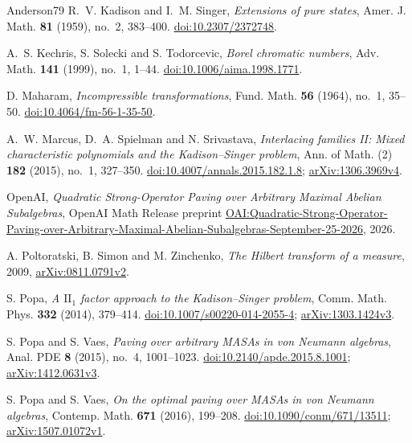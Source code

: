 \begin{thebibliography}{Anderson79}
R.~V. Kadison and I.~M. Singer,
\emph{Extensions of pure states},
Amer. J. Math. \textbf{81} (1959), no.~2, 383--400.
\href{https://doi.org/10.2307/2372748}{doi:10.2307/2372748}.

A.~S. Kechris, S. Solecki and S. Todorcevic,
\emph{Borel chromatic numbers},
Adv. Math. \textbf{141} (1999), no.~1, 1--44.
\href{https://doi.org/10.1006/aima.1998.1771}{doi:10.1006/aima.1998.1771}.

D. Maharam,
\emph{Incompressible transformations},
Fund. Math. \textbf{56} (1964), no.~1, 35--50.
\href{https://doi.org/10.4064/fm-56-1-35-50}{doi:10.4064/fm-56-1-35-50}.

A.~W. Marcus, D.~A. Spielman and N. Srivastava,
\emph{Interlacing families II: Mixed characteristic polynomials and the
Kadison--Singer problem},
Ann. of Math. (2) \textbf{182} (2015), no.~1, 327--350.
\href{https://doi.org/10.4007/annals.2015.182.1.8}{doi:10.4007/annals.2015.182.1.8};
\href{https://arxiv.org/abs/1306.3969v4}{arXiv:1306.3969v4}.

OpenAI,
\emph{Quadratic Strong-Operator Paving over Arbitrary Maximal Abelian Subalgebras},
OpenAI Math Release preprint
\href{https://github.com/openai/math/blob/main/preprints/Quadratic-Strong-Operator-Paving-over-Arbitrary-Maximal-Abelian-Subalgebras-September-25-2026/Quadratic-Strong-Operator-Paving-over-Arbitrary-Maximal-Abelian-Subalgebras-September-25-2026.pdf}{OAI:Quadratic-Strong-Operator-Paving-over-Arbitrary-Maximal-Abelian-Subalgebras-September-25-2026},
2026.

A. Poltoratski, B. Simon and M. Zinchenko,
\emph{The Hilbert transform of a measure},
2009, \href{https://arxiv.org/abs/0811.0791v2}{arXiv:0811.0791v2}.

S. Popa,
\emph{A \(\mathrm{II}_1\) factor approach to the Kadison--Singer problem},
Comm. Math. Phys. \textbf{332} (2014), 379--414.
\href{https://doi.org/10.1007/s00220-014-2055-4}{doi:10.1007/s00220-014-2055-4};
\href{https://arxiv.org/abs/1303.1424v3}{arXiv:1303.1424v3}.

S. Popa and S. Vaes,
\emph{Paving over arbitrary MASAs in von Neumann algebras},
Anal. PDE \textbf{8} (2015), no.~4, 1001--1023.
\href{https://doi.org/10.2140/apde.2015.8.1001}{doi:10.2140/apde.2015.8.1001};
\href{https://arxiv.org/abs/1412.0631v3}{arXiv:1412.0631v3}.

S. Popa and S. Vaes,
\emph{On the optimal paving over MASAs in von Neumann algebras},
Contemp. Math. \textbf{671} (2016), 199--208.
\href{https://doi.org/10.1090/conm/671/13511}{doi:10.1090/conm/671/13511};
\href{https://arxiv.org/abs/1507.01072v1}{arXiv:1507.01072v1}.


\end{thebibliography}
